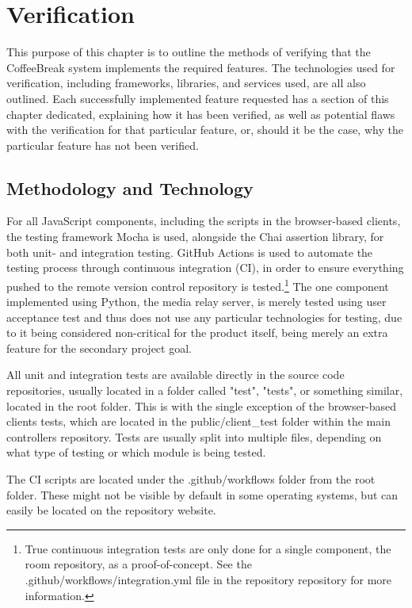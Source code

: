 \chapter{Verification}

This purpose of this chapter is to outline the methods of verifying that the CoffeeBreak system implements the required features. The technologies used for verification, including frameworks, libraries, and services used, are all also outlined. Each successfully implemented feature requested has a section of this chapter dedicated, explaining how it has been verified, as well as potential flaws with the verification for that particular feature, or, should it be the case, why the particular feature has not been verified.

\section{Methodology and Technology}

For all JavaScript components, including the scripts in the browser-based clients, the testing framework Mocha is used, alongside the Chai assertion library, for both unit- and integration testing. GitHub Actions is used to automate the testing process through continuous integration (CI), in order to ensure everything pushed to the remote version control repository is tested.\footnote{True continuous integration tests are only done for a single component, the room repository, as a proof-of-concept. See the .github/workflows/integration.yml file in the repository repository for more information.} The one component implemented using Python, the media relay server, is merely tested using user acceptance test and thus does not use any particular technologies for testing, due to it being considered non-critical for the product itself, being merely an extra feature for the secondary project goal.

All unit and integration tests are available directly in the source code repositories, usually located in a folder called "test", "tests", or something similar, located in the root folder. This is with the single exception of the browser-based clients tests, which are located in the public/client\_test folder within the main controllers repository. Tests are usually split into multiple files, depending on what type of testing or which module is being tested.

The CI scripts are located under the .github/workflows folder from the root folder. These might not be visible by default in some operating systems, but can easily be located on the repository website.

